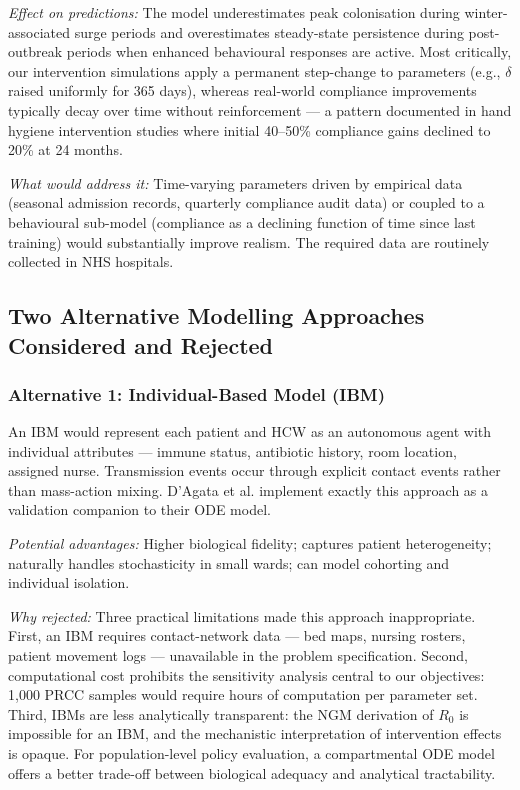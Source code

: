 \documentclass[12pt,a4paper]{article}
\begin{document}
\textit{Effect on predictions:} The model underestimates peak colonisation during winter-associated surge periods and overestimates steady-state persistence during post-outbreak periods when enhanced behavioural responses are active. Most critically, our intervention simulations apply a permanent step-change to parameters (e.g., $\delta$ raised uniformly for 365 days), whereas real-world compliance improvements typically decay over time without reinforcement --- a pattern documented in hand hygiene intervention studies where initial 40--50\% compliance gains declined to 20\% at 24 months.

\textit{What would address it:} Time-varying parameters driven by empirical data (seasonal admission records, quarterly compliance audit data) or coupled to a behavioural sub-model (compliance as a declining function of time since last training) would substantially improve realism. The required data are routinely collected in NHS hospitals.

\subsection{Two Alternative Modelling Approaches Considered and Rejected}

\subsubsection{Alternative 1: Individual-Based Model (IBM)}

An IBM would represent each patient and HCW as an autonomous agent with individual attributes --- immune status, antibiotic history, room location, assigned nurse. Transmission events occur through explicit contact events rather than mass-action mixing. D'Agata et al. \cite{dagata2007} implement exactly this approach as a validation companion to their ODE model.

\textit{Potential advantages:} Higher biological fidelity; captures patient heterogeneity; naturally handles stochasticity in small wards; can model cohorting and individual isolation.

\textit{Why rejected:} Three practical limitations made this approach inappropriate. First, an IBM requires contact-network data --- bed maps, nursing rosters, patient movement logs --- unavailable in the problem specification. Second, computational cost prohibits the sensitivity analysis central to our objectives: 1,000 PRCC samples would require hours of computation per parameter set. Third, IBMs are less analytically transparent: the NGM derivation of $R_0$ is impossible for an IBM, and the mechanistic interpretation of intervention effects is opaque. For population-level policy evaluation, a compartmental ODE model offers a better trade-off between biological adequacy and analytical tractability.
\end{document}
